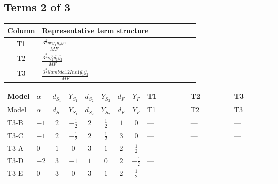\documentclass[8pt]{article}
\begin{document}
\begin{landscape}
\subsection*{Terms 2 of 3}
\begin{center}
\begin{tabular}{@{}c >{\raggedright\arraybackslash}p{0.82\linewidth}@{}}
\toprule
Column & Representative term structure \\
\midrule
T1 & \(\displaystyle \frac{3^{\frac{3}{4}} ye \overline{y_{1}} \overline{y_{2}} \overline{ye}}{MF}\) \\
\midrule
T2 & \(\displaystyle \frac{3^{\frac{3}{4}} i g_{2}^{2} \overline{y_{1}} \overline{y_{2}}}{MF}\) \\
\midrule
T3 & \(\displaystyle \frac{3^{\frac{3}{4}} i lambda12Inv1 \overline{y_{1}} \overline{y_{2}}}{MF}\) \\
\midrule
\bottomrule
\end{tabular}
\end{center}
\smallskip
\tiny
\begin{longtable}{@{}llcccccc >{\raggedright\arraybackslash}p{0.21\linewidth} >{\raggedright\arraybackslash}p{0.21\linewidth} >{\raggedright\arraybackslash}p{0.21\linewidth}@{}}
\toprule
Model & $\alpha$ & $d_{S_1}$ & $Y_{S_1}$ & $d_{S_2}$ & $Y_{S_2}$ & $d_F$ & $Y_F$ & T1 & T2 & T3 \\
\midrule
\endfirsthead
\toprule
Model & $\alpha$ & $d_{S_1}$ & $Y_{S_1}$ & $d_{S_2}$ & $Y_{S_2}$ & $d_F$ & $Y_F$ & T1 & T2 & T3 \\
\midrule
\endhead
T3-B & $-1$ & $2$ & $-\frac{1}{2}$ & $2$ & $\frac{1}{2}$ & $1$ & $0$ & --- & --- & --- \\
\midrule
T3-C & $-1$ & $2$ & $-\frac{1}{2}$ & $2$ & $\frac{1}{2}$ & $3$ & $0$ & --- & --- & --- \\
\midrule
T3-A & $0$ & $1$ & $0$ & $3$ & $1$ & $2$ & $\frac{1}{2}$ & \scriptsize\adjustbox{max width=\linewidth}{$\begin{gathered} \frac{3^{\frac{3}{4}} ye \overline{y_{1}} \overline{y_{2}} \overline{ye}}{12 MF}\end{gathered}$} & --- & --- \\
\midrule
T3-D & $-2$ & $3$ & $-1$ & $1$ & $0$ & $2$ & $-\frac{1}{2}$ & --- & \scriptsize\adjustbox{max width=\linewidth}{$\begin{gathered} - \frac{11 \cdot 3^{\frac{3}{4}} i g_{2}^{2} \overline{y_{1}} \overline{y_{2}}}{8 MF}\end{gathered}$} & \scriptsize\adjustbox{max width=\linewidth}{$\begin{gathered} - \frac{3^{\frac{3}{4}} i lambda12Inv1 \overline{y_{1}} \overline{y_{2}}}{6 MF}\end{gathered}$} \\
\midrule
T3-E & $0$ & $3$ & $0$ & $3$ & $1$ & $2$ & $\frac{1}{2}$ & --- & --- & --- \\
\midrule
\bottomrule
\end{longtable}
\clearpage

\end{landscape}
\end{document}
